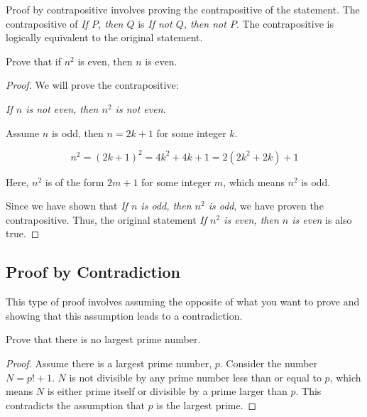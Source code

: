\documentclass{article}
\theoremstyle{mytheoremstyle}
\theoremstyle{mytheoremstyle}
\theoremstyle{myexamplestyle}
\begin{document}
Proof by contrapositive involves proving the contrapositive of the statement. The contrapositive of \emph{If \( P \), then \( Q \)} is \emph{If not \( Q \), then not \( P \)}. The contrapositive is logically equivalent to the original statement.


\begin{example}
    Prove that if \( n^2 \) is even, then \( n \) is even.

    \begin{proof}

        We will prove the contrapositive:

        \begin{center}
            \emph{If \( n \) is not even, then \( n^2 \) is not even.}
        \end{center}

        Assume \( n \) is odd, then \( n = 2k + 1 \) for some integer \( k \).

        \[ n^2 = (2k + 1)^2 = 4k^2 + 4k + 1 = 2(2k^2 + 2k) + 1 \]

        Here, \( n^2 \) is of the form \( 2m + 1 \) for some integer \( m \), which means \( n^2 \) is odd.

        Since we have shown that \emph{If \( n \) is odd, then \( n^2 \) is odd}, we have proven the contrapositive. Thus, the original statement \emph{If \( n^2 \) is even, then \( n \) is even} is also true.
    \end{proof}
\end{example}

\subsection{Proof by Contradiction}

This type of proof involves assuming the opposite of what you want to prove and showing that this assumption leads to a contradiction.


\begin{example}
    Prove that there is no largest prime number.
    \begin{proof}
        Assume there is a largest prime number, \( p \). Consider
        the number \( N = p! + 1 \). \( N \) is not divisible by any
        prime number less than or equal to \( p \), which means
        \( N \) is either prime itself or divisible by a prime
        larger than \( p \). This contradicts the assumption that
        \( p \) is the largest prime.
    \end{proof}
\end{example}
\end{document}
